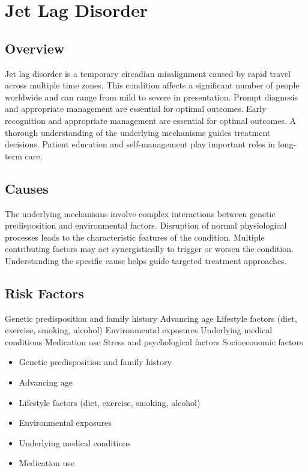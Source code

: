 \chapter{Jet Lag Disorder}
\label{sec:Jet Lag Disorder}

\section{Overview}
Jet lag disorder is a temporary circadian misalignment caused by rapid travel across multiple time zones. This condition affects a significant number of people worldwide and can range from mild to severe in presentation. Prompt diagnosis and appropriate management are essential for optimal outcomes. Early recognition and appropriate management are essential for optimal outcomes. A thorough understanding of the underlying mechanisms guides treatment decisions. Patient education and self-management play important roles in long-term care.
\section{Causes}
The underlying mechanisms involve complex interactions between genetic predisposition and environmental factors. Disruption of normal physiological processes leads to the characteristic features of the condition. Multiple contributing factors may act synergistically to trigger or worsen the condition. Understanding the specific cause helps guide targeted treatment approaches.
\section{Risk Factors}
Genetic predisposition and family history Advancing age Lifestyle factors (diet, exercise, smoking, alcohol) Environmental exposures Underlying medical conditions Medication use Stress and psychological factors Socioeconomic factors

\begin{itemize}[noitemsep]
  \item Genetic predisposition and family history
  \item Advancing age
  \item Lifestyle factors (diet, exercise, smoking, alcohol)
  \item Environmental exposures
  \item Underlying medical conditions
  \item Medication use
\end{itemize}
